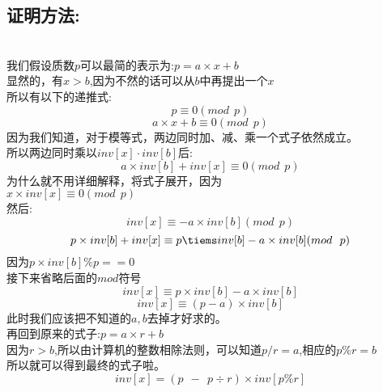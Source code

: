 \documentclass{article}
\begin{document}
\begin{CJK}{UTF8}{gbsn}
\begin{itemize}
    \subsection{证明方法:}\\
    我们假设质数\(p\)可以最简的表示为:\(p = a \times x + b\)\\
    显然的，有\(x > b\),因为不然的话可以从\(b\)中再提出一个\(x\)\\
    所以有以下的递推式:\\
    \[p\equiv 0 (mod \ \ p)\]
    \[a \times x + b \equiv 0 (mod \ \  p)\]
    因为我们知道，对于模等式，两边同时加、减、乘一个式子依然成立。\\
    所以两边同时乘以\(inv[x]\cdot inv[b]\)后:\\
    \[a\times inv[b] + inv[x] \equiv 0 (mod \ \ p)\]
    为什么就不用详细解释，将式子展开，因为 \\ \(x \times inv[x] \equiv 0 (mod \ \ p)\) \\
    然后:
    \[inv[x] \equiv -a \times inv[b] (mod \ \ p)\]
    \[p \times inv[b] + inv[x] \equiv p \tiems inv[b] - a\times inv[b] (mod \ \ p)\]
    因为\(p \times inv[b] \% p == 0\)\\
    接下来省略后面的\(mod\)符号\\
    \[inv[x]\equiv p\times inv[b] - a\times inv[b]\]
    \[inv[x]\equiv (p - a) \times inv[b]\]
    此时我们应该把不知道的\(a, b\)去掉才好求的。\\
    再回到原来的式子:\(p=a\times r+b\)\\
    因为\(r > b\),所以由计算机的整数相除法则，可以知道\(p/r = a\),相应的\(p\%r=b\)\\
    所以就可以得到最终的式子啦。\\
    \[inv[x] = (p\ \ -\ \ p\div r) \times inv[p\% r]\]
  \end{itemize}
\end{CJK}
\end{document}
